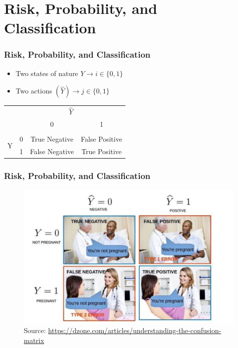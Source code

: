 \documentclass[
  shownotes,
  xcolor={svgnames},
  hyperref={colorlinks,citecolor=DarkBlue,linkcolor=andesred,urlcolor=DarkBlue}
  , aspectratio=169]{beamer}
\begin{document}
\section{Risk, Probability, and Classification}
\begin{frame}[fragile]
\frametitle{Risk, Probability, and Classification}

\begin{itemize}
  \item Two states of nature $Y \rightarrow i\in\{0,1\}$
  \medskip
  \item Two actions $(\hat{Y}) \rightarrow j\in \{0,1\}$
\end{itemize}

\begin{table}[H]
\centering
\begin{tabular}{cc|cc}
& \multicolumn{3}{c}{$\hat{Y}$}\tabularnewline
&  & 0 & 1 \\[5pt]
\hline\\[5pt]
\multirow{2}{*}{Y} & 0 & True Negative & False Positive \\[10pt]
& 1 & False Negative & True Positive \\
\end{tabular}
\end{table}
\end{frame}
\begin{frame}[fragile]
\frametitle{Risk, Probability, and Classification}

        \begin{figure}[H] \centering
            \captionsetup{justification=centering}
              \includegraphics[scale=0.4]{figures/confusion_matrix}
              \\
              \tiny
              Source: \url{https://dzone.com/articles/understanding-the-confusion-matrix}
 \end{figure}

  
\end{frame}
\end{document}
